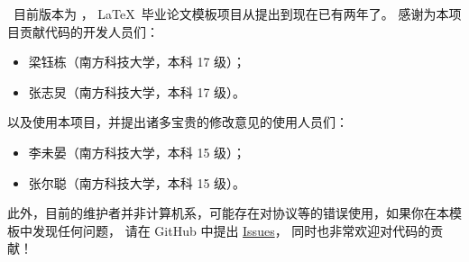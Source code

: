 \sustechthesis\ 目前版本为 \version， \LaTeX\ 毕业论文模板项目从提出到现在已有两年了。
感谢为本项目贡献代码的开发人员们：
\begin{itemize}
  \item 梁钰栋（南方科技大学，本科 17 级）；
  \item 张志炅（南方科技大学，本科 17 级）。
\end{itemize}
以及使用本项目，并提出诸多宝贵的修改意见的使用人员们：
\begin{itemize}
  \item 李未晏（南方科技大学，本科 15 级）；
  \item 张尔聪（南方科技大学，本科 15 级）。
\end{itemize}

此外，目前的维护者并非计算机系，可能存在对协议等的错误使用，如果你在本模板中发现任何问题，
请在 GitHub 中提出 \href{https://github.com/Iydon/sustechthesis/issues}{Issues}，
同时也非常欢迎对代码的贡献！

